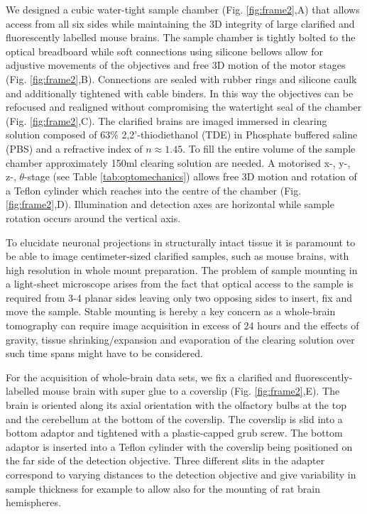 \documentclass[12pt]{spieman}  %
\begin{document}
\begin{spacing}{2}
We designed a cubic water-tight sample chamber (Fig. \ref{fig:frame2},A) that allows access from all six sides while maintaining the 3D integrity of large clarified and fluorescently labelled mouse brains. The sample chamber is tightly bolted  to the optical breadboard while soft connections using silicone bellows allow for adjustive movements of the objectives and free 3D motion of the motor stages (Fig. \ref{fig:frame2},B). Connections are sealed with rubber rings and silicone caulk and additionally tightened with cable binders. In this way the objectives can be refocused and realigned without compromising the watertight seal of the chamber (Fig. \ref{fig:frame2},C). The clarified brains are imaged immersed in clearing solution composed of 63\% 2,2'-thiodiethanol (TDE) in Phosphate buffered saline (PBS) and a refractive index of $n \approx 1.45$\cite{Costantini}. To fill the entire volume of the sample chamber approximately 150ml clearing solution are needed. A motorised x-, y-, z-, $\theta$-stage (see Table \ref{tab:optomechanics}) allows free 3D motion and rotation of a Teflon cylinder which reaches into the centre of the chamber (Fig. \ref{fig:frame2},D). Illumination and detection axes are horizontal while sample rotation occurs around the vertical axis.		
		
To elucidate neuronal projections in structurally intact tissue it is paramount to be able to image centimeter-sized clarified samples, such as mouse brains, with high resolution in whole mount preparation. The problem of sample mounting in a light-sheet microscope arises from the fact that optical access to the sample is required from 3-4 planar sides leaving only two opposing sides to insert, fix and move the sample. Stable mounting is hereby a key concern as a whole-brain tomography can require image acquisition in excess of 24 hours and the effects of gravity, tissue shrinking/expansion and evaporation of the clearing solution over such time spans might have to be considered. 

For the acquisition of whole-brain data sets, we fix a clarified and fluorescently-labelled mouse brain with super glue to a coverslip (Fig. \ref{fig:frame2},E). The brain is oriented along its axial orientation with the olfactory bulbs at the top and the cerebellum at the bottom of the coverslip. The coverslip is slid into a bottom adaptor and tightened with a plastic-capped grub screw. The bottom adaptor is inserted into a Teflon cylinder with the coverslip being positioned on the far side of the detection objective. Three different slits in the adapter correspond to varying distances to the detection objective and give variability in sample thickness for example to allow also for the mounting of rat brain hemispheres.
	

\end{spacing}
\end{document}
